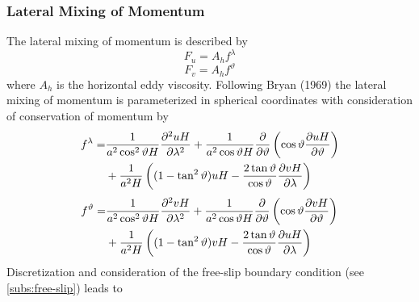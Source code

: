 \documentclass[a4paper]{article}
\begin{document}
\subsubsection{Lateral Mixing of Momentum}
The lateral mixing of momentum is described by
\begin{equation}
  F_u=A_hf^\lambda
\end{equation}
\begin{equation}
  F_v=A_hf^\vartheta
\end{equation}
where $A_h$ is the horizontal eddy viscosity. Following Bryan (1969) the lateral mixing of momentum is
parameterized in spherical coordinates with consideration of conservation of momentum by
\begin{equation}\begin{split}
  f^\lambda=&\frac1{a^2\cos^2\vartheta
    H}\frac{\partial^2 {uH}}{\partial {\lambda}^2}+\frac1{a^2\cos\vartheta H}\frac{\partial {}}{\partial {\vartheta}}\left(\cos\vartheta\frac{\partial {uH}}{\partial {\vartheta}}\right)\\
  &+\frac1{a^2H}\left((1-\tan^2\vartheta)uH-\frac{2\tan\vartheta}{\cos\vartheta}\frac{\partial {vH}}{\partial {\lambda}}\right)
\end{split}\end{equation}
\begin{equation}\begin{split}
  f^\vartheta=&\frac1{a^2\cos^2\vartheta
    H}\frac{\partial^2 {vH}}{\partial {\lambda}^2}+\frac1{a^2\cos\vartheta H}\frac{\partial {}}{\partial {\vartheta}}\left(\cos\vartheta\frac{\partial {vH}}{\partial {\vartheta}}\right)\\
  &+\frac1{a^2H}\left((1-\tan^2\vartheta)vH-\frac{2\tan\vartheta}{\cos\vartheta}\frac{\partial {uH}}{\partial {\lambda}}\right)
\end{split}\end{equation}
Discretization and consideration of the free-slip boundary condition (see \ref{subs:free-slip}) leads to
\end{document}
